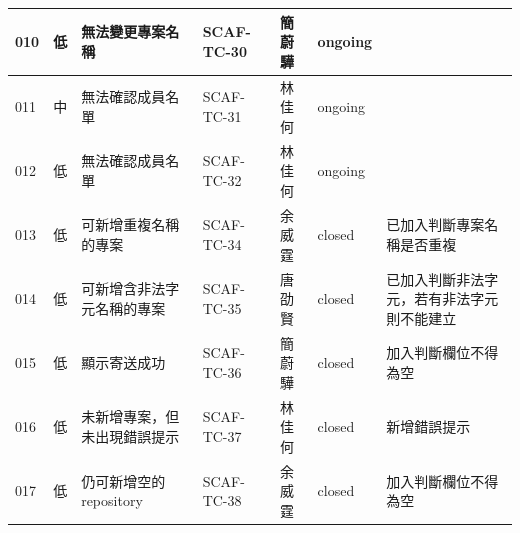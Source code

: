 \documentclass{report}
\begin{document}
\begin{tabularx}{\textwidth}{
  |p{}%
  |p{}%
  |p{}%
  |p{}%
  |p{}%
  |p{}%
  |p{}|%
}
  \hline
  010 & 低 & 無法變更專案名稱 & SCAF-TC-30 & 簡蔚驊 & ongoing & \\
  \hline
  011 & 中 & 無法確認成員名單 & SCAF-TC-31 & 林佳何 & ongoing & \\
  \hline
  012 & 低 & 無法確認成員名單 & SCAF-TC-32 & 林佳何 & ongoing & \\
  \hline
  013 & 低 & 可新增重複名稱的專案 & SCAF-TC-34 & 余威霆 & closed & 已加入判斷專案名稱是否重複 \\
  \hline
  014 & 低 & 可新增含非法字元名稱的專案 & SCAF-TC-35 & 唐劭賢  & closed & 已加入判斷非法字元，若有非法字元則不能建立 \\
  \hline
  015 & 低 & 顯示寄送成功 & SCAF-TC-36 & 簡蔚驊 & closed & 加入判斷欄位不得為空 \\
  \hline
  016 & 低 & 未新增專案，但未出現錯誤提示 & SCAF-TC-37 & 林佳何 & closed & 新增錯誤提示 \\
  \hline
  017 & 低 & 仍可新增空的repository & SCAF-TC-38 & 余威霆 & closed & 加入判斷欄位不得為空 \\
  \hline
\end{tabularx}
\\
\newline
\\
\end{document}

